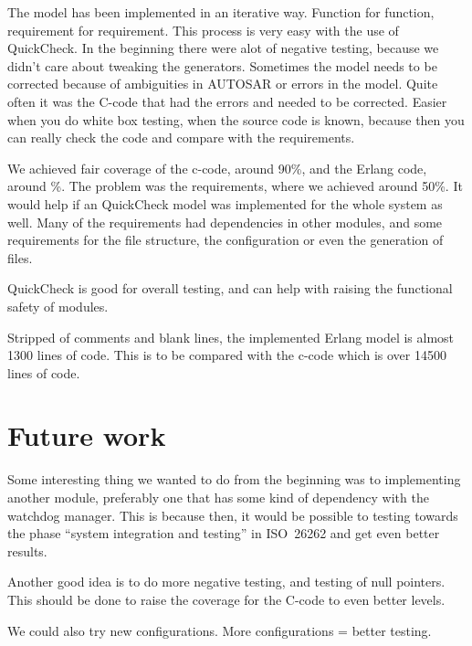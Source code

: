 
The model has been implemented in an iterative way. Function for function,
requirement for requirement. This process is very easy with the use of
QuickCheck.
In the beginning there were alot of negative testing, because we didn't care
about tweaking the generators.
Sometimes the model needs to be corrected because of ambiguities in AUTOSAR or
errors in the model. Quite often it was the C-code that had the errors and
needed to be corrected.
Easier when you do white box testing, when the source code is known,
because then you can really check the code and compare with the requirements.

We achieved fair coverage of the c-code, around 90\%, and the Erlang code,
around \%. The problem was the requirements, where we achieved around 50\%. It
would help if an QuickCheck model was implemented for the whole system as
well. Many of the requirements had dependencies in other modules, and some
requirements for the file structure, the configuration or even the generation of
files.

QuickCheck is good for overall testing, and can help with raising the functional
safety of modules.


Stripped of comments and blank lines, the implemented Erlang model is
almost 1300 lines of code. This is to be compared with the c-code
which is over 14500 lines of code.


\section{Future work}
Some interesting thing we wanted to do from the beginning was to implementing
another module, preferably one that has some kind of dependency with the
watchdog manager. This is because then, it would be possible to testing towards
the phase ``system integration and testing'' in ISO~26262 and get even better
results.

Another good idea is to do more negative testing, and testing of null
pointers. This should be done to raise the coverage for the C-code to even
better levels.

We could also try new configurations. More configurations = better testing.